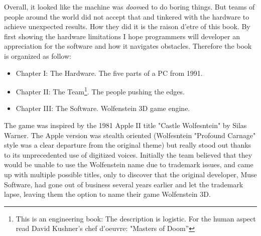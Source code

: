 Overall, it looked like the machine was \emph{doom}ed to do boring things. But teams of people around the world did not accept that and tinkered with the hardware to achieve unexpected results. How they did it is the raison d'etre of this book. By first showing the hardware limitations I hope programmers will developer an appreciation for the software and how it navigates obstacles. Therefore the book is organized as follow:
\begin{itemize}
\item Chapter I: The Hardware. The five parts of a PC from 1991.
\item Chapter II: The Team\footnote{This is an engineering book: The description is logistic. For the human aspect read David Kushner's chef d'oeuvre: "Masters of Doom''}. The people pushing the edges.
\item Chapter III: The Software. Wolfenstein 3D game engine.
\end{itemize}
\par
{} The game was inspired by the 1981 Apple II title "Castle Wolfesntein" by Silas Warner. The Apple version was stealth oriented (Wolfesntein "Profound Carnage" style was a clear departure from the original theme) but really stood out thanks to its unprecedented use of digitized voices. Initially the team believed that they would be unable to use the Wolfenstein name due to trademark issues, and came up with multiple possible titles, only to discover that the original developer, Muse Software, had gone out of business several years earlier and let the trademark lapse, leaving them the option to name their game Wolfenstein 3D.

\begin{figure}[H]
\centering
{}
\end{figure}

